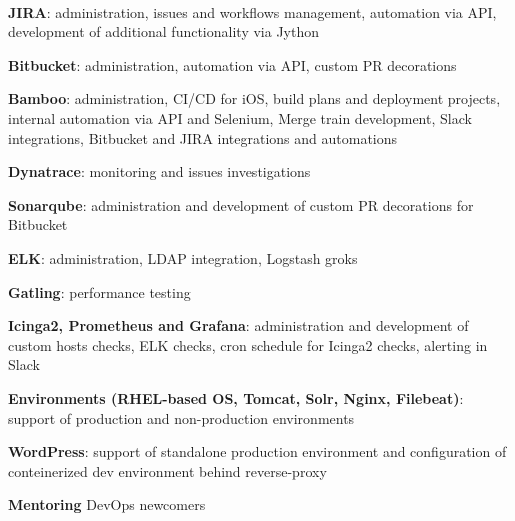 \documentclass[a4paper]{MagicalCV}
\begin{document}
\begin{minipage}[t]{0.66\textwidth} 


 \\
\vspace{\topsep} %
\begin{tightemize}
  \item \textbf{JIRA}: administration, issues and workflows management, automation via API,
    development of additional functionality via Jython
  \item \textbf{Bitbucket}: administration, automation via API, custom PR decorations
  \item \textbf{Bamboo}: administration, CI/CD for iOS, build plans and deployment projects,
    internal automation via API and Selenium, Merge train development, Slack integrations,
    Bitbucket and JIRA integrations and automations
  \item \textbf{Dynatrace}: monitoring and issues investigations
  \item \textbf{Sonarqube}: administration and development of custom PR decorations for Bitbucket
  \item \textbf{ELK}: administration, LDAP integration, Logstash groks
  \item \textbf{Gatling}: performance testing
  \item \textbf{Icinga2, Prometheus and Grafana}: administration and development of custom hosts checks,
    ELK checks, cron schedule for Icinga2 checks, alerting in Slack
  \item \textbf{Environments (RHEL-based OS, Tomcat, Solr, Nginx, Filebeat)}: support of production and
    non-production environments
  \item \textbf{WordPress}: support of standalone production environment and configuration of conteinerized
    dev environment behind reverse-proxy
  \item \textbf{Mentoring} DevOps newcomers
\end{tightemize}
\sectionsep


\end{minipage}
\end{document}
